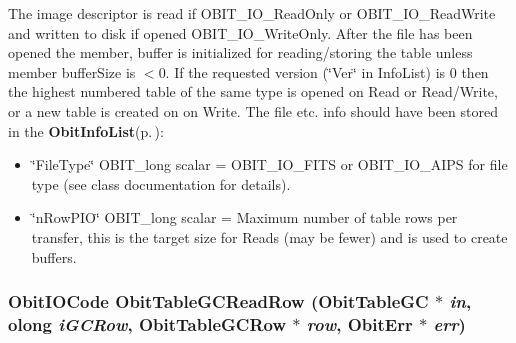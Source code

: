 The image descriptor is read if OBIT\_\-IO\_\-Read\-Only or OBIT\_\-IO\_\-Read\-Write and written to disk if opened OBIT\_\-IO\_\-Write\-Only. After the file has been opened the member, buffer is initialized for reading/storing the table unless member buffer\-Size is $<$0. If the requested version (\char`\"{}Ver\char`\"{} in Info\-List) is 0 then the highest numbered table of the same type is opened on Read or Read/Write, or a new table is created on on Write. The file etc. info should have been stored in the {\bf Obit\-Info\-List}{\rm (p.\,\pageref{structObitInfoList})}: \begin{itemize}
\item \char`\"{}File\-Type\char`\"{} OBIT\_\-long scalar = OBIT\_\-IO\_\-FITS or OBIT\_\-IO\_\-AIPS for file type (see class documentation for details). \item \char`\"{}n\-Row\-PIO\char`\"{} OBIT\_\-long scalar = Maximum number of table rows per transfer, this is the target size for Reads (may be fewer) and is used to create buffers. 
\end{itemize}
\subsubsection{\setlength{\rightskip}{0pt plus 5cm}Obit\-IOCode Obit\-Table\-GCRead\-Row ({\bf Obit\-Table\-GC} $\ast$ {\em in}, {\bf olong} {\em i\-GCRow}, {\bf Obit\-Table\-GCRow} $\ast$ {\em row}, {\bf Obit\-Err} $\ast$ {\em err})}\label{ObitTableGC_8c_a22}


